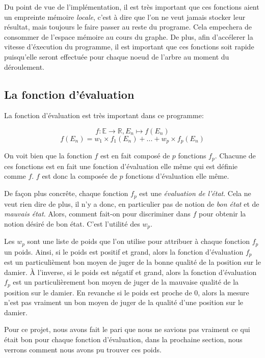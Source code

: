 \documentclass[a4paper,11pt]{article}
\begin{document}
\begin{multicols}{2}[]
    Du point de vue de l'implémentation, il est très important que ces fonctions
    aient un empreinte mémoire \emph{locale}, c'est à dire que l'on ne veut
    jamais stocker leur résultat, mais toujours le faire passer au reste du
    programe. Cela empechera de consommer de l'espace mémoire au cours du
    graphe. De plus, afin d'accélerer la vitesse d'éxecution du programme, il
    est important que ces fonctions soit rapide puisqu'elle seront effectuée
    pour chaque noeud de l'arbre au moment du déroulement.

  \subsection{La fonction d'évaluation}

    La fonction d'évaluation est très important dans ce programme:
    
    \[ f : \mathbb{E} \to \mathbb{R},
      E_{n} \mapsto f(E_{n}) \]
    \[ f(E_{n}) = w_{1} \times f_{1}(E_{n}) + ... + w_{p} \times f_{p}(E_{n}) \]

    On voit bien que la fonction $f$ est en fait composé de $p$ fonctions
    $f_{p}$. Chacune de ces fonctions est en fait une fonction d'évaluation elle
    même qui est définie comme $f$. $f$ est donc la composée de $p$ fonctions
    d'évaluation elle même.

    De façon plus concrête, chaque fonction $f_{p}$ est une \emph{évaluation de
    l'état}. Cela ne veut rien dire de plus, il n'y a donc, en particulier pas
    de notion de \emph{bon état} et de \emph{mauvais état}. Alors, comment
    fait-on pour discriminer dans $f$ pour obtenir la notion désiré de bon état.
    C'est l'utilité des $w_{p}$.

    Les $w_{p}$ sont une liste de poids que l'on utilise pour attribuer à chaque
    fonction $f_{p}$ un poids. Ainsi, si le poids est positif et grand, alors la
    fonction d'évaluation $f_{p}$ est un particulièment bon moyen de juger de la
    bonne qualité de la position sur le damier. À l'inverse, si le poids est
    négatif et grand, alors la fonction d'évaluation $f_{p}$ est un
    particulièrement bon moyen de juger de la mauvaise qualité de la position
    sur le damier. En revanche si le poids est proche de $0$, alors la mesure
    n'est pas vraiment un bon moyen de juger de la qualité d'une position sur le
    damier.

    Pour ce projet, nous avons fait le pari que nous ne savions pas vraiment ce
    qui était bon pour chaque fonction d'évaluation, dans la prochaine section,
    nous verrons comment nous avons pu trouver ces poids.


\end{multicols}
\end{document}
